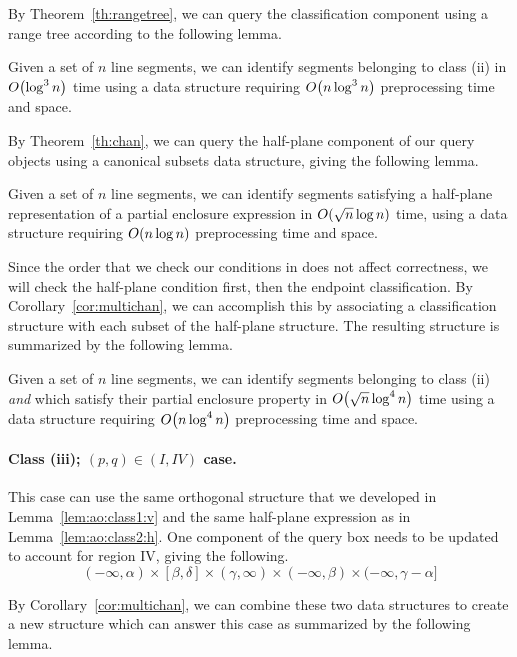 By Theorem~\ref{th:rangetree}, we can query the classification component using a range tree according to the following lemma.
\begin{lemma}
\label{lem:ao:class2:v}
Given a set of $n$ line segments, we can identify segments belonging to class (ii) in $O\!\left(\log^3{n}\right)$ time using a data structure requiring $O\!\left(n\log^3{n}\right)$ preprocessing time and space.
\end{lemma}

By Theorem~\ref{th:chan}, we can query the half-plane component of our query objects using a canonical subsets data structure, giving the following lemma.

\begin{lemma}
\label{lem:ao:class2:h}
Given a set of $n$ line segments, we can identify segments satisfying a half-plane representation of a partial enclosure expression in $O\!\left(\sqrt{n}\log{n}\right)$ time, using a data structure requiring $O\!\left(n\log{n}\right)$ preprocessing time and space.
\end{lemma}

Since the order that we check our conditions in does not affect correctness, we will check the half-plane condition first, then the endpoint classification.  
By Corollary~\ref{cor:multichan}, we can accomplish this by associating a classification structure with each subset of the half-plane structure. The resulting structure is summarized by the following lemma.

\begin{lemma}
\label{lem:ao:class2:c}
Given a set of $n$ line segments, we can identify segments belonging to class (ii) \emph{and} which satisfy their partial enclosure property in $O\!\left(\sqrt{n}\log^4{n}\right)$ time using a data structure requiring $O\!\left(n\log^4{n}\right)$ preprocessing time and space.
\end{lemma}


\paragraph{Class (iii); $(p, q) \in (I, IV)$ case.} 
This case can use the same orthogonal structure that we developed in Lemma~\ref{lem:ao:class1:v} and the same half-plane expression as in Lemma~\ref{lem:ao:class2:h}. 
One component of the query box needs to be updated to account for region IV, giving the following.
\[
(-\infty, \alpha) \times [\beta, \delta] \times (\gamma, \infty) \times (-\infty, \beta) \times (-\infty, \gamma - \alpha]
\]

By Corollary~\ref{cor:multichan}, we can combine these two data structures to create a new structure which can answer this case as summarized by the following lemma.

